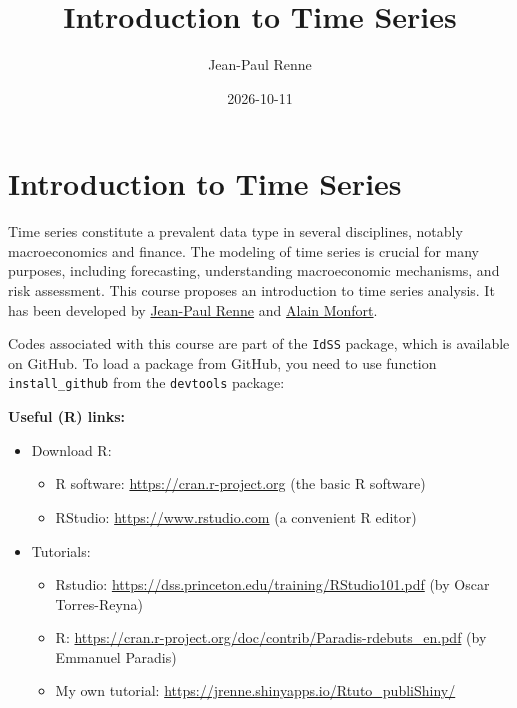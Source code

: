 \documentclass[
  11pt,
]{book}
\title{Introduction to Time Series}
\author{Jean-Paul Renne}
\date{2026-10-11}
\providecommand{\tightlist}{%
  \setlength{\itemsep}{0pt}\setlength{\parskip}{0pt}}
\theoremstyle{definition}
\theoremstyle{definition}
\theoremstyle{definition}
\theoremstyle{definition}
\theoremstyle{remark}
\begin{document}
\maketitle

{
\setcounter{tocdepth}{1}
\tableofcontents
}
\newcommand{\bv}[1]{\mathbf{#1}}

\chapter*{Introduction to Time Series}\label{intro}

Time series constitute a prevalent data type in several disciplines, notably macroeconomics and finance. The modeling of time series is crucial for many purposes, including forecasting, understanding macroeconomic mechanisms, and risk assessment. This course proposes an introduction to time series analysis. It has been developed by \href{https://www.jprenne.com}{Jean-Paul Renne} and \href{https://faculty.crest.fr/amonfort/}{Alain Monfort}.

Codes associated with this course are part of the \texttt{IdSS} package, which is available on GitHub. To load a package from GitHub, you need to use function \texttt{install\_github} from the \texttt{devtools} package:

\textbf{Useful (R) links:}

\begin{itemize}
\item
  Download R:

  \begin{itemize}
  \tightlist
  \item
    R software: \url{https://cran.r-project.org} (the basic R software)
  \item
    RStudio: \url{https://www.rstudio.com} (a convenient R editor)
  \end{itemize}
\item
  Tutorials:

  \begin{itemize}
  \tightlist
  \item
    Rstudio: \url{https://dss.princeton.edu/training/RStudio101.pdf} (by Oscar Torres-Reyna)
  \item
    R: \url{https://cran.r-project.org/doc/contrib/Paradis-rdebuts_en.pdf} (by Emmanuel Paradis)
  \item
    My own tutorial: \url{https://jrenne.shinyapps.io/Rtuto_publiShiny/}
  \end{itemize}
\end{itemize}
\end{document}
